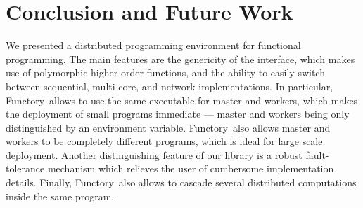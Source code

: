 \documentclass[tfpsymp,pagenumbers]{tfp07symp}
\newcommand{\functory}{\textsf{Functory}}
\begin{document}
\section{Conclusion and Future Work}\label{sec:future}

We presented a distributed programming environment for functional
programming. The main features are the genericity of the interface,
which makes use of polymorphic higher-order functions, and the ability
to easily switch between sequential, multi-core, and network
implementations. In particular, \functory\ allows to use the same
executable for master and workers, which makes the deployment of small programs
immediate --- master and workers being only distinguished by an
environment variable. \functory\ also allows master and workers to be
completely different programs, which is ideal for large scale deployment.
Another distinguishing feature of our library is a
robust fault-tolerance mechanism which relieves
the user of cumbersome implementation details.
Finally, \functory\ also allows to cascade several distributed
computations inside the same program.
\end{document}
